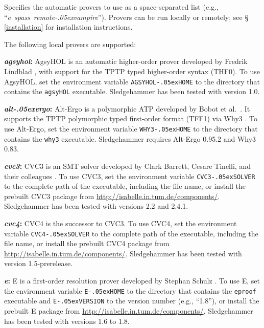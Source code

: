 \documentclass[a4paper,12pt]{article}
\newcommand\download{\url{http://isabelle.in.tum.de/components/}}
\let\oldS=\S
\def\S{\oldS\,}
\renewcommand\_{\hbox{\textunderscore\kern-.05ex}}
\begin{document}
\begin{enum}
Specifies the automatic provers to use as a space-separated list (e.g.,
``\textit{e}~\textit{spass}~\textit{remote\_vampire\/}'').
Provers can be run locally or remotely; see \S\ref{installation} for
installation instructions.

The following local provers are supported:

\begin{sloppy}
\begin{enum}
\item[\labelitemi] \textbf{\textit{agsyhol}:} AgsyHOL is an automatic
higher-order prover developed by Fredrik Lindblad \cite{agsyHOL},
with support for the TPTP typed higher-order syntax (THF0). To use AgsyHOL, set
the environment variable \texttt{AGSYHOL\_HOME} to the directory that contains
the \texttt{agsyHOL} executable. Sledgehammer has been tested with version 1.0.

\item[\labelitemi] \textbf{\textit{alt\_ergo}:} Alt-Ergo is a polymorphic
ATP developed by Bobot et al.\ \cite{alt-ergo}.
It supports the TPTP polymorphic typed first-order format (TFF1) via Why3
\cite{why3}. To use Alt-Ergo, set the environment variable \texttt{WHY3\_HOME}
to the directory that contains the \texttt{why3} executable. Sledgehammer
requires Alt-Ergo 0.95.2 and Why3 0.83.

\item[\labelitemi] \textbf{\textit{cvc3}:} CVC3 is an SMT solver developed by
Clark Barrett, Cesare Tinelli, and their colleagues \cite{cvc3}. To use CVC3,
set the environment variable \texttt{CVC3\_SOLVER} to the complete path of the
executable, including the file name, or install the prebuilt CVC3 package from
\download. Sledgehammer has been tested with versions 2.2 and 2.4.1.

\item[\labelitemi] \textbf{\textit{cvc4}:} CVC4 \cite{cvc4} is the successor to
CVC3. To use CVC4, set the environment variable \texttt{CVC4\_SOLVER} to the
complete path of the executable, including the file name, or install the
prebuilt CVC4 package from \download. Sledgehammer has been tested with version
1.5-prerelease.

\item[\labelitemi] \textbf{\textit{e}:} E is a first-order resolution prover
developed by Stephan Schulz \cite{schulz-2002}. To use E, set the environment
variable \texttt{E\_HOME} to the directory that contains the \texttt{eproof}
executable and \texttt{E\_VERSION} to the version number (e.g., ``1.8''), or
install the prebuilt E package from \download. Sledgehammer has been tested with
versions 1.6 to 1.8.


\end{enum}
\end{sloppy}
\end{enum}
\end{document}
